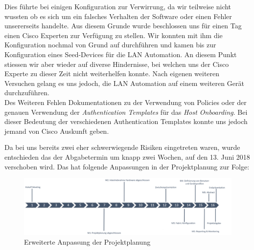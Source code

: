 Dies führte bei einigen Konfiguration zur Verwirrung, da wir teilweise nicht wussten ob es sich um ein falsches Verhalten der Software oder einen Fehler unsererseits handelte. Aus diesem Grunde wurde beschlossen uns für einen Tag einen Cisco Experten zur Verfügung zu stellen. Wir konnten mit ihm die Konfiguration nochmal von Grund auf durchführen und kamen bis zur Konfiguration eines Seed-Devices für die LAN Automation. An diesem Punkt stiessen wir aber wieder auf diverse Hindernisse, bei welchen uns der Cisco Experte zu dieser Zeit nicht weiterhelfen konnte. Nach eigenen weiteren Versuchen gelang es uns jedoch, die LAN Automation auf einem weiteren Gerät durchzuführen.\\
Des Weiteren Fehlen Dokumentationen zu der Verwendung von Policies oder der genauen Verwendung der \textit{Authentication Templates} für das \textit{Host Onboarding}. Bei dieser Bedeutung der verschiedenen Authentication Templates konnte uns jedoch jemand von Cisco Auskunft geben. 

Da bei uns bereits zwei eher schwerwiegende Risiken eingetreten waren, wurde entschieden das der Abgabetermin um knapp zwei Wochen, auf den 13. Juni 2018 verschoben wird. Das hat folgende Anpassungen in der Projektplanung zur Folge:


\begin{figure}[H]
	\centering
	\includegraphics[width=16cm]{img/ZeitlichePlanung_v4.png}
	\caption{Erweiterte Anpassung der Projektplanung}
	\label{fig:Erweiterte Anpassungen der Projektplanung}
\end{figure} 


